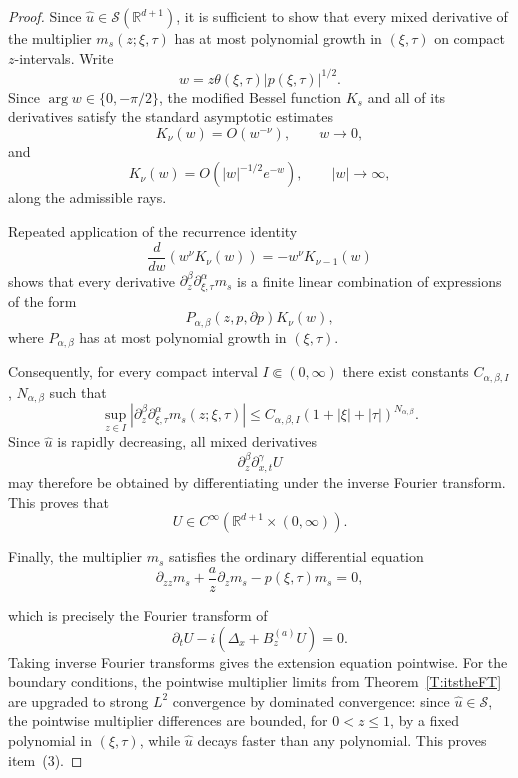 \documentclass[11pt,letter]{amsart}
\def \RNu {\mathbb{R}^{d+1}}
\numberwithin{equation}{section}
\numberwithin{equation}{section}
\begin{document}
\begin{proof}

Since
$\widehat u\in\mathscr S(\RNu)$,
it is sufficient to show that every mixed derivative of the multiplier
$m_s(z;\xi,\tau)$ has at most polynomial growth in
$(\xi,\tau)$ on compact $z$-intervals.
Write
\[
w = z\theta(\xi,\tau)|p(\xi,\tau)|^{1/2}.
\]
Since
$\arg w\in\{0,-\pi/2\}$,
the modified Bessel function $K_s$
and all of its derivatives satisfy the standard asymptotic estimates
\[
K_\nu(w) = O(w^{-\nu}),
\qquad
w\rightarrow0,
\]
and
\[
K_\nu(w)
=
O(|w|^{-1/2}e^{-w}),
\qquad
|w|\rightarrow\infty,
\]
along the admissible rays.

Repeated application of the recurrence identity
\[
\frac{d}{dw}
\left(
w^\nu K_\nu(w)
\right) = - w^\nu K_{\nu-1}(w)
\]
shows that every derivative
$\partial_z^\beta\partial_{\xi,\tau}^\alpha m_s$
is a finite linear combination of expressions of the form
\[
P_{\alpha,\beta}
(z,p,\partial p)
K_\nu(w),
\]
where
$P_{\alpha,\beta}$
has at most polynomial growth in
$(\xi,\tau)$.

Consequently, for every compact interval
$I\Subset(0,\infty)$
there exist constants
$C_{\alpha,\beta,I}$,
$N_{\alpha,\beta}$
such that
\[
\sup_{z\in I}
\left|
\partial_z^\beta
\partial_{\xi,\tau}^\alpha
m_s(z;\xi,\tau)
\right|
\le
C_{\alpha,\beta,I}
(1+|\xi|+|\tau|)^{N_{\alpha,\beta}}.
\]
Since
$\widehat u$
is rapidly decreasing,
all mixed derivatives
\[
\partial_z^\beta
\partial_{x,t}^\gamma U
\]
may therefore be obtained by differentiating under the inverse Fourier
transform.
This proves that
\[
U
\in
C^\infty(\mathbb R^{d+1}\times(0,\infty)).
\]

Finally, the multiplier
$m_s$
satisfies the ordinary differential equation
\[
\partial_{zz}m_s
+
\frac az
\partial_zm_s
-
p(\xi,\tau)m_s
=
0,
\]

which is precisely the Fourier transform of
\[
\partial_tU
-
i(\Delta_x+B_z^{(a)}U)
=
0.
\]
Taking inverse Fourier transforms gives the extension equation
pointwise.
For the boundary conditions, the pointwise multiplier limits from
Theorem~\ref{T:itstheFT} are upgraded to strong $L^2$ convergence by dominated
convergence: since $\widehat u\in\mathscr S$, the pointwise multiplier differences
are bounded, for $0<z\le1$, by a fixed polynomial in $(\xi,\tau)$, while
$\widehat u$ decays faster than any polynomial. This proves item~(3).





\end{proof}
\end{document}
